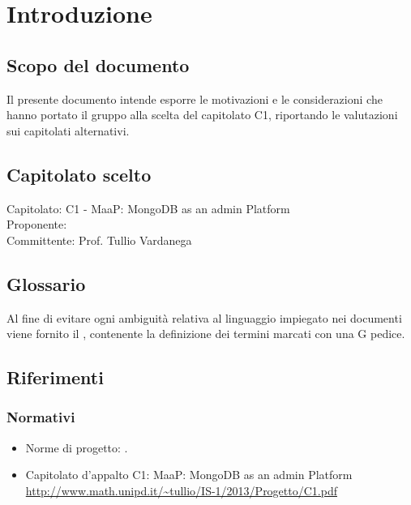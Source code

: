 \section{Introduzione}

\subsection{Scopo del documento}
Il presente documento intende esporre le motivazioni e le considerazioni che hanno portato il gruppo alla scelta del capitolato C1, riportando le valutazioni sui capitolati alternativi.

\subsection{Capitolato scelto}
Capitolato: C1 - MaaP: MongoDB as an admin Platform\\
Proponente: \Proponente{} \\
Committente: Prof. Tullio Vardanega \\

\subsection{Glossario}
Al fine di evitare ogni ambiguità relativa al linguaggio impiegato nei documenti viene fornito il \Glossario, contenente la definizione dei termini marcati con una G pedice.

\subsection{Riferimenti}

	\subsubsection{Normativi}
	\begin{itemize}
		\item Norme di progetto: \NormeDiProgetto .
		\item Capitolato d’appalto C1: MaaP: MongoDB as an admin Platform\\
			\url	{http://www.math.unipd.it/~tullio/IS-1/2013/Progetto/C1.pdf}
	\end{itemize}

